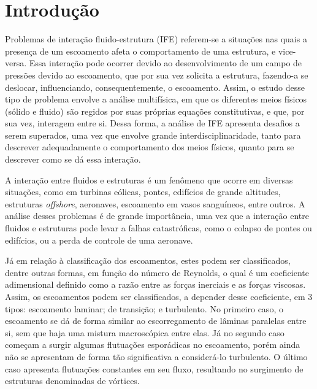 \chapter{Introdução}

Problemas de interação fluido-estrutura (IFE) referem-se a situações nas quais a presença de um escoamento afeta o comportamento de uma estrutura, e vice-versa. Essa interação pode ocorrer devido ao desenvolvimento de um campo de pressões devido ao escoamento, que por sua vez solicita a estrutura, fazendo-a se deslocar, influenciando, consequentemente, o escoamento. Assim, o estudo desse tipo de problema envolve a análise multifísica, em que os diferentes meios físicos (sólido e fluido) são regidos por suas próprias equações constitutivas, e que, por sua vez, interagem entre si. Dessa forma, a análise de IFE apresenta desafios a serem superados, uma vez que envolve grande interdisciplinaridade, tanto para descrever adequadamente o comportamento dos meios físicos, quanto para se descrever como se dá essa interação.

A interação entre fluidos e estruturas é um fenômeno que ocorre em diversas situações, como em turbinas eólicas, pontes, edifícios de grande altitudes, estruturas \textit{offshore}, aeronaves, escoamento em vasos sanguíneos, entre outros. A análise desses problemas é de grande importância, uma vez que a interação entre fluidos e estruturas pode levar a falhas catastróficas, como o colapso de pontes ou edifícios, ou a perda de controle de uma aeronave.

Já em relação à classificação dos escoamentos, estes podem ser classificados, dentre outras formas, em função do número de Reynolds, o qual é um coeficiente adimensional definido como a razão entre as forças inerciais e as forças viscosas. Assim, os escoamentos podem ser classificados, a depender desse coeficiente, em 3 tipos: escoamento laminar; de transição; e turbulento. No primeiro caso, o escoamento se dá de forma similar ao escorregamento de lâminas paralelas entre si, sem que haja uma mistura macroscópica entre elas. Já no segundo caso começam a surgir algumas flutuações esporádicas no escoamento, porém ainda não se apresentam de forma tão significativa a considerá-lo turbulento. O último caso apresenta flutuações constantes em seu fluxo, resultando no surgimento de estruturas denominadas de vórtices.

